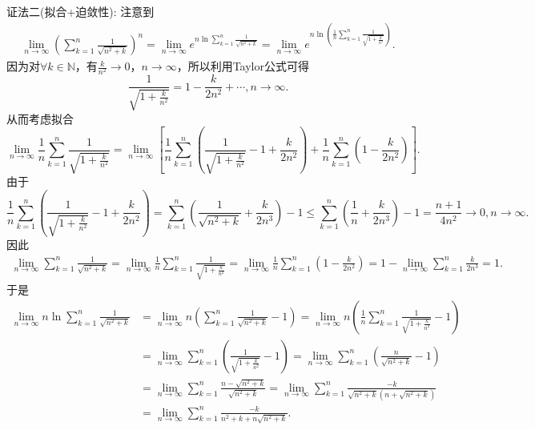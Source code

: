 \documentclass[../../main.tex]{subfiles}%
\begin{document}
\begin{solution}
{\color{blue}证法二(拟合+迫敛性):}
注意到
\begin{align}
\lim_{n\rightarrow \infty} \left( \sum\limits_{k=1}^n{\frac{1}{\sqrt{n^2+k}}} \right) ^n=\lim_{n\rightarrow \infty} e^{n\ln \sum\limits_{k=1}^n{\frac{1}{\sqrt{n^2+k}}}}=\lim_{n\rightarrow \infty} e^{n\ln \left( \frac{1}{n}\sum\limits_{k=1}^n{\frac{1}{\sqrt{1+\frac{k}{n^2}}}} \right)}. \label{example4.14-1.0}
\end{align}
因为对\(\forall k\in \mathbb{N}\)，有\(\frac{k}{n^2}\rightarrow 0\)，\(n\rightarrow \infty\)，所以利用Taylor公式可得
\[
\frac{1}{\sqrt{1+\frac{k}{n^2}}}=1-\frac{k}{2n^2}+\cdots ,n\rightarrow \infty.
\]
从而考虑拟合
\[
\lim_{n\rightarrow \infty} \frac{1}{n}\sum\limits_{k=1}^n{\frac{1}{\sqrt{1+\frac{k}{n^2}}}}=\lim_{n\rightarrow \infty} \left[ \frac{1}{n}\sum\limits_{k=1}^n{\left( \frac{1}{\sqrt{1+\frac{k}{n^2}}}-1+\frac{k}{2n^2} \right)}+\frac{1}{n}\sum\limits_{k=1}^n{\left( 1-\frac{k}{2n^2} \right)} \right] .
\]
由于
\[
\frac{1}{n}\sum\limits_{k=1}^n{\left( \frac{1}{\sqrt{1+\frac{k}{n^2}}}-1+\frac{k}{2n^2} \right)}=\sum\limits_{k=1}^n{\left( \frac{1}{\sqrt{n^2+k}}+\frac{k}{2n^3} \right)}-1\leqslant \sum\limits_{k=1}^n{\left( \frac{1}{n}+\frac{k}{2n^3} \right)}-1=\frac{n+1}{4n^2}\rightarrow 0,n\rightarrow \infty.
\]
因此
\begin{align*}
\lim_{n\rightarrow \infty} \sum\limits_{k=1}^n{\frac{1}{\sqrt{n^2+k}}}=\lim_{n\rightarrow \infty} \frac{1}{n}\sum\limits_{k=1}^n{\frac{1}{\sqrt{1+\frac{k}{n^2}}}}
=\lim_{n\rightarrow \infty} \frac{1}{n}\sum\limits_{k=1}^n{\left( 1-\frac{k}{2n^2} \right)}
=1-\lim_{n\rightarrow \infty} \sum\limits_{k=1}^n{\frac{k}{2n^3}}
=1.
\end{align*}
于是
\begin{align}
\lim_{n\rightarrow \infty} n\ln \sum\limits_{k=1}^n{\frac{1}{\sqrt{n^2+k}}}&=\lim_{n\rightarrow \infty} n\left( \sum\limits_{k=1}^n{\frac{1}{\sqrt{n^2+k}}}-1 \right) =\lim_{n\rightarrow \infty} n\left( \frac{1}{n}\sum\limits_{k=1}^n{\frac{1}{\sqrt{1+\frac{k}{n^2}}}}-1 \right) 
\nonumber \\
&=\lim_{n\rightarrow \infty} \sum\limits_{k=1}^n{\left( \frac{1}{\sqrt{1+\frac{k}{n^2}}}-1 \right)}=\lim_{n\rightarrow \infty} \sum\limits_{k=1}^n{\left( \frac{n}{\sqrt{n^2+k}}-1 \right)}
\nonumber \\
&=\lim_{n\rightarrow \infty} \sum\limits_{k=1}^n{\frac{n-\sqrt{n^2+k}}{\sqrt{n^2+k}}}=\lim_{n\rightarrow \infty} \sum\limits_{k=1}^n{\frac{-k}{\sqrt{n^2+k}\left( n+\sqrt{n^2+k} \right)}}
\nonumber \\
&=\lim_{n\rightarrow \infty} \sum\limits_{k=1}^n{\frac{-k}{n^2+k+n\sqrt{n^2+k}}}.\label{example4.14-1.2}

\end{align}
\end{solution}
\end{document}
